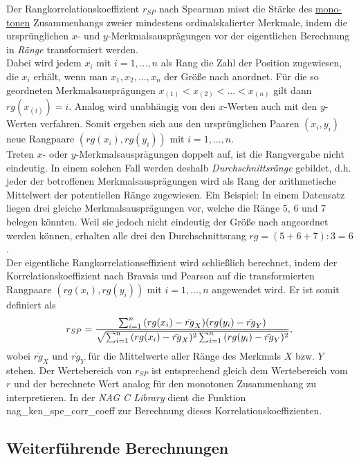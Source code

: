 \documentclass{article}
\begin{document}
Der Rangkorrelationskoeffizient $r_{SP}$ nach Spearman misst die Stärke des \underline{mono-}\\\underline{tonen} Zusammenhangs zweier mindestens ordinalskalierter Merkmale, indem die ursprünglichen $x$- und $y$-Merkmalsausprägungen vor der eigentlichen Berechnung in {\it Ränge} transformiert werden.\\
Dabei wird jedem $x_i$ mit $i=1,...,n$ als Rang die Zahl der Position zugewiesen, die $x_i$ erhält, wenn man $x_1, x_2, ..., x_n$ der Größe nach anordnet. Für die so geordneten Merkmalsausprägungen $x_{(1)}<x_{(2)}<...<x_{(n)}$ gilt dann $rg(x_{(i)})=i$. Analog wird unabhängig von den $x$-Werten auch mit den $y$-Werten verfahren. Somit ergeben sich aus den ursprünglichen Paaren $(x_i, y_i)$ neue Rangpaare $(rg(x_i), rg(y_i))$ mit $i=1,...,n$.\\
Treten $x$- oder $y$-Merkmalsausprägungen doppelt auf, ist die Rangvergabe nicht eindeutig. In einem solchen Fall werden deshalb {\it Durchschnittsränge} gebildet, d.h. jeder der betroffenen Merkmalsausprägungen wird als Rang der arithmetische Mittelwert der potentiellen Ränge zugewiesen. Ein Beispiel: In einem Datensatz liegen drei gleiche Merkmalsausprägungen vor, welche die Ränge 5, 6 und 7 belegen könnten. Weil sie jedoch nicht eindeutig der Größe nach angeordnet werden können, erhalten alle drei den Durchschnittsrang $rg=(5+6+7):3=6$.\\
Der eigentliche Rangkorrelationseffizient wird schließlich berechnet, indem der Korrelationskoeffizient nach Bravais und Pearson auf die transformierten Rangpaare $(rg(x_i), rg(y_i))$ mit $i=1,...,n$ angewendet wird. Er ist somit definiert als
\begin{equation*}
    r_{SP}=\dfrac{\sum_{i=1}^{n}{(rg(x_i)-\bar{rg}_X)(rg(y_i)-\bar{rg}_Y)}}{\sqrt{\sum_{i=1}^{n}{(rg(x_i)-\bar{rg}_X)^2\sum_{i=1}^{n}{(rg(y_i)-\bar{rg}_Y)^2}}}},\\
\end{equation*}
wobei $\bar{rg}_X$ und $\bar{rg}_Y$ für die Mittelwerte aller Ränge des Merkmals $X$ bzw. $Y$ stehen. Der Wertebereich von $r_{SP}$ ist entsprechend gleich dem Wertebereich vom $r$ und der berechnete Wert analog für den monotonen Zusammenhang zu interpretieren.
In der {\it NAG C Library} dient die Funktion nag\_ken\_spe\_corr\_coeff zur Berechnung dieses Korrelationskoeffizienten.

\subsection{Weiterführende Berechnungen}
\end{document}
